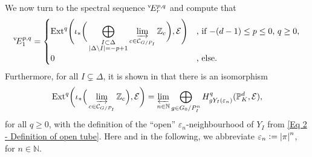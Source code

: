 \documentclass[a4paper, reqno, 10pt]{amsart}
\theoremstyle{definition}
\numberwithin{equation}{section}
\newcommand{\abs}[1]{{\lvert{#1}\rvert}}
\newcommand{\defeq}{\vcentcolon=}
\newcommand{\Ext}{{\mathrm{Ext}}}
\newcommand{\BN}{{\mathbb {N}}}
\newcommand{\BP}{{\mathbb {P}}}
\newcommand{\BZ}{{\mathbb {Z}}}
\newcommand{\CC}{{\mathcal {C}}}
\newcommand{\CE}{{\mathcal {E}}}
\newcommand{\unif}{{\pi}}
\begin{document}
We now turn to the spectral sequence $^{\rm v}\! E_r^{p,q}$ and compute that
\begin{equation*}
	^{\rm v}\! E^{p,q}_1 = \begin{cases} \displaystyle
		\Ext^q \Bigg( \iota_\ast \bigg( \bigoplus\limits_{\substack{I\subset \Delta \\ \abs{\Delta\setminus I}=-p+1}} \varinjlim\limits_{c\in \CC_{G/P_I}} \BZ_c \bigg) , \CE \Bigg) & \text{, if $-(d-1)\leq p\leq 0$, $q \geq 0$,} \\
		0 & \text{, else.}
	\end{cases}
\end{equation*}
Furthermore, for all $I\subsetneq \Delta$, it is shown in \cite[Prop.\ 2.2.1]{Orlik08EquivVBDrinfeldUpHalfSp} that there is an isomorphism
\begin{equation}\label{Eq 3 - Isomorphism between Ext groups and local cohomology}
	\Ext^q \bigg( \iota_\ast \Big( \varinjlim_{c\in \CC_{G/P_I}} \BZ_c \Big) , \CE \bigg) = \varprojlim_{n\in \BN} \bigoplus_{g \in G_0/P_I^n} H^q_{g Y_I(\varepsilon_n)} (\BP_K^d, \CE) ,
\end{equation}
for all $q\geq 0$, with the definition of the ``open'' $\varepsilon_n$-neighbourhood of $Y_I$ from \eqref{Eq 2 - Definition of open tube}.
Here and in the following, we abbreviate $\varepsilon_n \defeq \abs{\unif}^n$, for $n\in \BN$.
\end{document}
